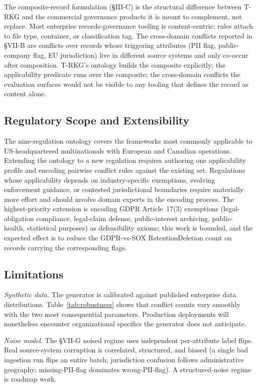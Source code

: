 \documentclass{ieeeaccess}
\begin{document}
The composite-record formulation (§III-C) is the structural difference between T-RKG and the commercial governance products it is meant to complement, not replace. Most enterprise records-governance tooling is content-centric: rules attach to file type, container, or classification tag. The cross-domain conflicts reported in §VII-B are conflicts over records whose triggering attributes (PII flag, public-company flag, EU jurisdiction) live in different source systems and only co-occur after composition. T-RKG's ontology builds the composite explicitly; the applicability predicate runs over the composite; the cross-domain conflicts the evaluation surfaces would not be visible to any tooling that defines the record as content alone.

\subsection{Regulatory Scope and Extensibility}

The nine-regulation ontology covers the frameworks most commonly applicable to US-headquartered multinationals with European and Canadian operations. Extending the ontology to a new regulation requires authoring one applicability profile and encoding pairwise conflict rules against the existing set. Regulations whose applicability depends on industry-specific exemptions, evolving enforcement guidance, or contested jurisdictional boundaries require materially more effort and should involve domain experts in the encoding process. The highest-priority extension is encoding GDPR Article~17(3) exemptions (legal-obligation compliance, legal-claim defense, public-interest archiving, public-health, statistical purposes) as defeasibility axioms; this work is bounded, and the expected effect is to reduce the GDPR-vs-SOX RetentionDeletion count on records carrying the corresponding flags.

\subsection{Limitations}

\textit{Synthetic data.} The generator is calibrated against published enterprise data distributions. Table~\ref{tab:robustness} shows that conflict counts vary smoothly with the two most consequential parameters. Production deployments will nonetheless encounter organizational specifics the generator does not anticipate.

\textit{Noise model.} The §VII-G noised regime uses independent per-attribute label flips. Real source-system corruption is correlated, structured, and biased (a single bad ingestion run flips an entire batch; jurisdiction confusion follows administrative geography; missing-PII-flag dominates wrong-PII-flag). A structured-noise regime is roadmap work.
\end{document}
